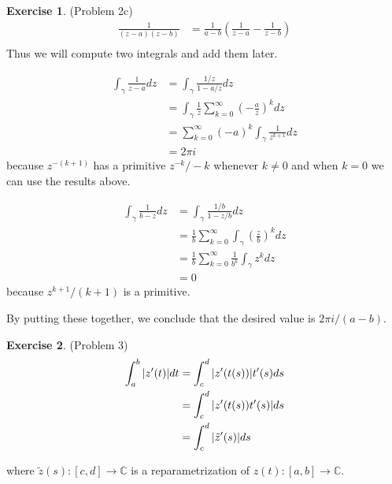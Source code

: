\documentclass[12pt, psamsfonts]{amsart}
\theoremstyle{definition}
\newtheorem*{exer}{Exercise}
\theoremstyle{remark}
\numberwithin{equation}{section}
\begin{document}
\begin{exer}{(Problem 2c)}
  \begin{align*}
    \frac{1}{(z - a)(z - b)}
      &= \frac{1}{a - b}(\frac{1}{z - a} - \frac{1}{z - b}) \\
  \end{align*}
  Thus we will compute two integrals and add them later.

  \begin{align*}
    \int_{\gamma} \frac{1}{z - a} dz
      &= \int_{\gamma} \frac{1 / z}{1 - a / z} dz \\
      &= \int_{\gamma} \frac{1}{z} \sum_{k=0}^{\infty} (-\frac{a}{z})^k dz \\
      &= \sum_{k=0}^{\infty} (-a)^k\int_{\gamma} \frac{1}{z^{k + 1}} dz \\
      &= 2\pi i
  \end{align*}
  because $z^{-(k + 1)}$ has a primitive $z^{-k}/-k$ whenever $k \ne 0$ and when $k = 0$ we can use the results above.

  \begin{align*}
    \int_{\gamma} \frac{1}{b - z} dz
      &= \int_{\gamma} \frac{1 / b}{1 - z / b} dz \\
      &= \frac{1}{b} \sum_{k=0}^{\infty} \int_{\gamma} (\frac{z}{b})^k dz \\
      &= \frac{1}{b} \sum_{k=0}^{\infty} \frac{1}{b^k} \int_{\gamma} z^k dz \\
      &= 0
  \end{align*}
  because $z^{k + 1} / (k + 1)$ is a primitive.

  By putting these together, we conclude that the desired value is $2\pi i / (a - b)$.
\end{exer}

\begin{exer}{(Problem 3)}
  \begin{align*}
    \int_a^b \abs{z'(t)} dt
      &= \int_c^d \abs{z'(t(s))}t'(s) ds \\
      &= \int_c^d \abs{z'(t(s))t'(s)} ds \\
      &= \int_c^d \abs{\tilde{z}'(s)} ds
  \end{align*}
  
  where $\tilde{z}(s): [c, d] \rightarrow \mathbb{C}$ is a reparametrization of $z(t): [a, b] \rightarrow \mathbb{C}$.
\end{exer}
\end{document}
